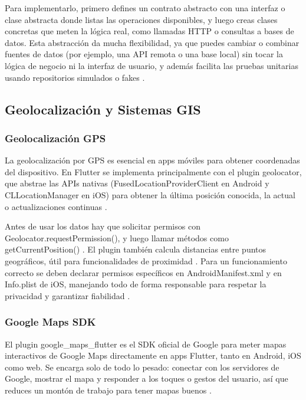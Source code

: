 Para implementarlo, primero defines un contrato abstracto con una interfaz o clase abstracta donde listas las operaciones disponibles, y luego creas clases concretas que meten la lógica real, como llamadas HTTP o consultas a bases de datos. Esta abstracción da mucha flexibilidad, ya que puedes cambiar o combinar fuentes de datos (por ejemplo, una API remota o una base local) sin tocar la lógica de negocio ni la interfaz de usuario, y además facilita las pruebas unitarias usando repositorios simulados o fakes \cite{CodewithAndreaRepoPattern, MediumCleanArchRepo}.

\subsection{Geolocalización y Sistemas GIS}

\subsubsection{Geolocalización GPS}
La geolocalización por GPS es esencial en apps móviles para obtener coordenadas del dispositivo. En Flutter se implementa principalmente con el plugin geolocator, que abstrae las APIs nativas (FusedLocationProviderClient en Android y CLLocationManager en iOS) para obtener la última posición conocida, la actual o actualizaciones continuas \cite{PubDevGeolocator}.

Antes de usar los datos hay que solicitar permisos con Geolocator.requestPermission(), y luego llamar métodos como getCurrentPosition() \cite{ReaniSolucionesGPS}. El plugin también calcula distancias entre puntos geográficos, útil para funcionalidades de proximidad \cite{PubDevGeolocator}. Para un funcionamiento correcto se deben declarar permisos específicos en AndroidManifest.xml y en Info.plist de iOS, manejando todo de forma responsable para respetar la privacidad y garantizar fiabilidad \cite{ReaniSolucionesGPS}.

\subsubsection{Google Maps SDK}
El plugin google\_maps\_flutter es el SDK oficial de Google para meter mapas interactivos de Google Maps directamente en apps Flutter, tanto en Android, iOS como web. Se encarga solo de todo lo pesado: conectar con los servidores de Google, mostrar el mapa y responder a los toques o gestos del usuario, así que reduces un montón de trabajo para tener mapas buenos \cite{GoogleDocsMapsConfig}.

